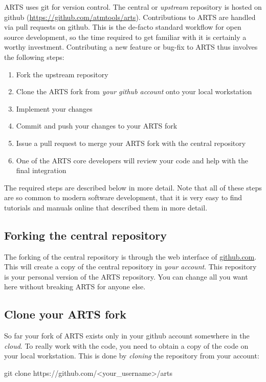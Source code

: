 ARTS uses git for version control. The central or \textit{upstream} repository
is hosted on github (\url{https://github.com/atmtools/arts}). Contributions to
ARTS are handled via pull requests on github. This is the de-facto standard
workflow for open source development, so the time required to get familiar with
it is certainly a worthy investment. Contributing a new feature or bug-fix to
ARTS thus involves the following steps:

\begin{enumerate}
\item Fork the upstream repository
\item Clone the ARTS fork from \textit{your github account} onto your local
  workstation
\item Implement your changes
\item Commit and push your changes to your ARTS fork
\item Issue a pull request to merge your ARTS fork with the central repository
\item One of the ARTS core developers will review your code and help with the
  final integration
\end{enumerate}


The required steps are described below in more detail. Note that all of these
steps are so common to modern software development, that it is very easy to find
tutorials and manuals online that described them in more detail.


\subsection{Forking the central repository}

The forking of the central repository is through the web interface of
\url{github.com}. This will create a copy of the central repository in
\textit{your account}. This repository is your personal version of the ARTS
repository. You can change all you want here without breaking ARTS for anyone
else.

\subsection{Clone your ARTS fork}

So far your fork of ARTS exists only in your github account somewhere in
the \textit{cloud}. To really work with the code, you need to obtain a copy
of the code on your local workstation. This is done by \textit{cloning} the
repository from your account:
\begin{code}
  git clone https://github.com/<your_username>/arts
\end{code}

